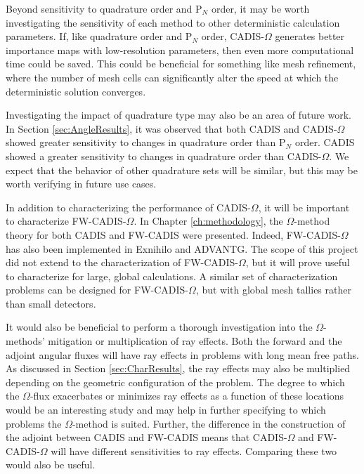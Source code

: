 Beyond sensitivity to quadrature order and P$_N$ order, it may be worth
investigating the sensitivity of each method to other deterministic calculation
parameters. If, like quadrature order and P$_N$ order, CADIS-$\Omega$ generates
better importance maps with low-resolution parameters, then even more
computational time could be saved. This could be beneficial for something like
mesh refinement, where the number of mesh cells can significantly alter the
speed at which the deterministic solution converges.

Investigating the impact of quadrature type may also be an area of future work.
In Section \ref{sec:AngleResults}, it was observed that both CADIS and
CADIS-$\Omega$ showed greater sensitivity to changes in quadrature order than
P$_N$ order. CADIS showed a greater sensitivity to changes in quadrature order
than CADIS-$\Omega$. We expect that the behavior of other quadrature sets will
be similar, but this may be worth verifying in future use cases.

In addition to characterizing the performance of CADIS-$\Omega$, it will be
important to characterize FW-CADIS-$\Omega$. In Chapter \ref{ch:methodology},
the $\Omega$-method theory for both CADIS and FW-CADIS were presented. Indeed,
FW-CADIS-$\Omega$ has also been implemented in Exnihilo and ADVANTG. The scope
of this project did not extend to the characterization of FW-CADIS-$\Omega$, but
it will prove useful to characterize for large, global calculations. A similar
set of characterization problems can be designed for FW-CADIS-$\Omega$, but with
global mesh tallies rather than small detectors.

It would also be beneficial to
perform a thorough investigation into the $\Omega$-methods' mitigation or
multiplication of ray effects. Both the forward and the adjoint angular fluxes
will have ray effects in problems with long mean free paths. As discussed in
Section \ref{sec:CharResults},
the ray effects may also be multiplied depending on the geometric
configuration of the problem. The degree to which the $\Omega$-flux exacerbates
or minimizes ray effects as a function of these locations would be an
interesting study and may help in further specifying to which problems the
$\Omega$-method is suited. Further, the difference in the construction of the
adjoint between CADIS and FW-CADIS means that CADIS-$\Omega$ and
FW-CADIS-$\Omega$ will have different sensitivities to ray effects. Comparing
these two would also be useful.

